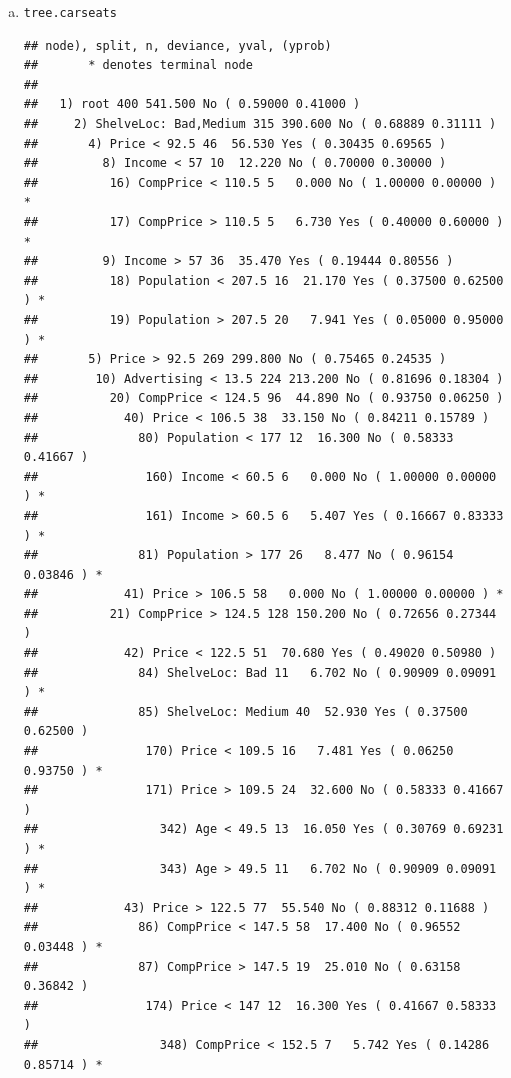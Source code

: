 \documentclass{article}\usepackage[]{graphicx}\usepackage[]{color}
\makeatletter
\newcommand{\hlstd}[1]{\textcolor[rgb]{0.345,0.345,0.345}{#1}}%
\newenvironment{kframe}{%
 \def\at@end@of@kframe{}%
 \ifinner\ifhmode%
  \def\at@end@of@kframe{\end{minipage}}%
  \begin{minipage}{\columnwidth}%
 \fi\fi%
 \def\FrameCommand##1{\hskip\@totalleftmargin \hskip-\fboxsep
 \colorbox{shadecolor}{##1}\hskip-\fboxsep
     \hskip-\linewidth \hskip-\@totalleftmargin \hskip\columnwidth}%
 \MakeFramed {\advance\hsize-\width
   \@totalleftmargin\z@ \linewidth\hsize
   \@setminipage}}%
 {\par\unskip\endMakeFramed%
 \at@end@of@kframe}
\newenvironment{knitrout}{}{} %
\makeatother
\begin{document}
\begin{enumerate}[(a)]
\item
\begin{knitrout}
\color{fgcolor}\begin{kframe}
\begin{alltt}
\hlstd{tree.carseats}
\end{alltt}
\begin{verbatim}
## node), split, n, deviance, yval, (yprob)
##       * denotes terminal node
## 
##   1) root 400 541.500 No ( 0.59000 0.41000 )  
##     2) ShelveLoc: Bad,Medium 315 390.600 No ( 0.68889 0.31111 )  
##       4) Price < 92.5 46  56.530 Yes ( 0.30435 0.69565 )  
##         8) Income < 57 10  12.220 No ( 0.70000 0.30000 )  
##          16) CompPrice < 110.5 5   0.000 No ( 1.00000 0.00000 ) *
##          17) CompPrice > 110.5 5   6.730 Yes ( 0.40000 0.60000 ) *
##         9) Income > 57 36  35.470 Yes ( 0.19444 0.80556 )  
##          18) Population < 207.5 16  21.170 Yes ( 0.37500 0.62500 ) *
##          19) Population > 207.5 20   7.941 Yes ( 0.05000 0.95000 ) *
##       5) Price > 92.5 269 299.800 No ( 0.75465 0.24535 )  
##        10) Advertising < 13.5 224 213.200 No ( 0.81696 0.18304 )  
##          20) CompPrice < 124.5 96  44.890 No ( 0.93750 0.06250 )  
##            40) Price < 106.5 38  33.150 No ( 0.84211 0.15789 )  
##              80) Population < 177 12  16.300 No ( 0.58333 0.41667 )  
##               160) Income < 60.5 6   0.000 No ( 1.00000 0.00000 ) *
##               161) Income > 60.5 6   5.407 Yes ( 0.16667 0.83333 ) *
##              81) Population > 177 26   8.477 No ( 0.96154 0.03846 ) *
##            41) Price > 106.5 58   0.000 No ( 1.00000 0.00000 ) *
##          21) CompPrice > 124.5 128 150.200 No ( 0.72656 0.27344 )  
##            42) Price < 122.5 51  70.680 Yes ( 0.49020 0.50980 )  
##              84) ShelveLoc: Bad 11   6.702 No ( 0.90909 0.09091 ) *
##              85) ShelveLoc: Medium 40  52.930 Yes ( 0.37500 0.62500 )  
##               170) Price < 109.5 16   7.481 Yes ( 0.06250 0.93750 ) *
##               171) Price > 109.5 24  32.600 No ( 0.58333 0.41667 )  
##                 342) Age < 49.5 13  16.050 Yes ( 0.30769 0.69231 ) *
##                 343) Age > 49.5 11   6.702 No ( 0.90909 0.09091 ) *
##            43) Price > 122.5 77  55.540 No ( 0.88312 0.11688 )  
##              86) CompPrice < 147.5 58  17.400 No ( 0.96552 0.03448 ) *
##              87) CompPrice > 147.5 19  25.010 No ( 0.63158 0.36842 )  
##               174) Price < 147 12  16.300 Yes ( 0.41667 0.58333 )  
##                 348) CompPrice < 152.5 7   5.742 Yes ( 0.14286 0.85714 ) *

\end{verbatim}
\end{kframe}
\end{knitrout}
\end{enumerate}
\end{document}
